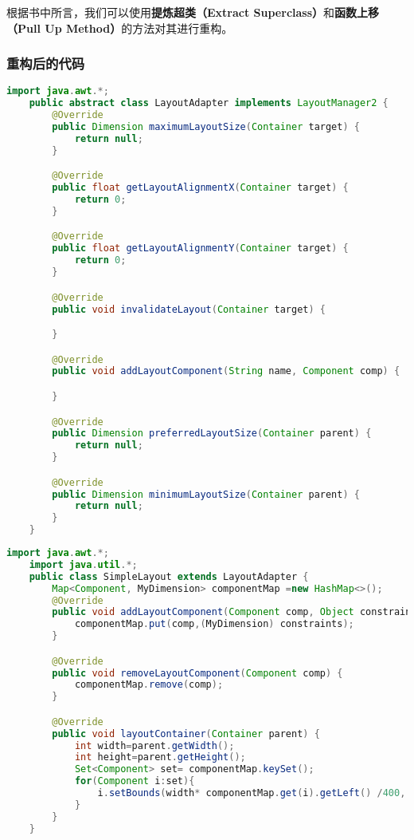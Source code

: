 \documentclass[a4paper]{article}
\begin{document}
根据书中所言，我们可以使用\textbf{提炼超类（Extract Superclass）}和\textbf{函数上移（Pull Up Method）}的方法对其进行重构。
\subsubsection*{重构后的代码}
\begin{lstlisting}[language={java}]
    import java.awt.*;
    public abstract class LayoutAdapter implements LayoutManager2 {
        @Override
        public Dimension maximumLayoutSize(Container target) {
            return null;
        }

        @Override
        public float getLayoutAlignmentX(Container target) {
            return 0;
        }

        @Override
        public float getLayoutAlignmentY(Container target) {
            return 0;
        }

        @Override
        public void invalidateLayout(Container target) {

        }

        @Override
        public void addLayoutComponent(String name, Component comp) {

        }

        @Override
        public Dimension preferredLayoutSize(Container parent) {
            return null;
        }

        @Override
        public Dimension minimumLayoutSize(Container parent) {
            return null;
        }
    }
\end{lstlisting}
\begin{lstlisting}[language={java}]
    import java.awt.*;
    import java.util.*;
    public class SimpleLayout extends LayoutAdapter {
        Map<Component, MyDimension> componentMap =new HashMap<>();
        @Override
        public void addLayoutComponent(Component comp, Object constraints) {
            componentMap.put(comp,(MyDimension) constraints);
        }

        @Override
        public void removeLayoutComponent(Component comp) {
            componentMap.remove(comp);
        }

        @Override
        public void layoutContainer(Container parent) {
            int width=parent.getWidth();
            int height=parent.getHeight();
            Set<Component> set= componentMap.keySet();
            for(Component i:set){
                i.setBounds(width* componentMap.get(i).getLeft() /400, height* componentMap.get(i).getTop() /300, componentMap.get(i).getWidth(), componentMap.get(i).getHeight());
            }
        }
    }
\end{lstlisting}
\end{document}
